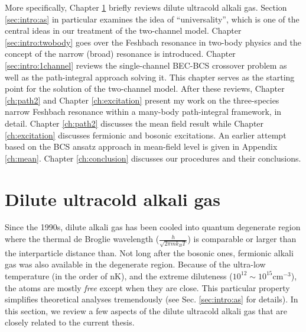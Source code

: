 More specifically, Chapter \ref{sec:intro:one} briefly reviews  dilute ultracold alkali gas.   Section \ref{sec:intro:as} in particular examines the idea of ``universality'', which is one of the central ideas in our treatment of the two-channel model.  Chapter \ref{sec:intro:twobody} goes over the Feshbach resonance in two-body physics and  the concept of  the narrow (broad) resonance is introduced. Chapter \ref{sec:intro:1channel} reviews the single-channel BEC-BCS crossover problem as well as the path-integral approach solving it. This chapter serves as the starting point for the solution of the two-channel model. After these reviews,   Chapter \ref{ch:path2} and Chapter \ref{ch:excitation} present my work on the three-species narrow Feshbach resonance within a many-body path-integral framework, in detail.   Chapter \ref{ch:path2} discusses the mean field result while Chapter \ref{ch:excitation} discusses fermionic and bosonic excitations. An earlier attempt   based on the BCS ansatz  approach in mean-field level is given in Appendix \ref{ch:mean}.  Chapter \ref{ch:conclusion} discusses our procedures and their conclusions.  

\chapter{Dilute ultracold alkali gas}\label{sec:intro:one}
  Since the 1990s, dilute  alkali gas has been cooled into quantum degenerate region where the thermal de Broglie wavelength ($\frac{h}{\sqrt{2\pi{m}k_{B}{T}}}$) is comparable or larger than the interparticle distance than.  Not long after the bosonic ones, fermionic alkali gas was also available in the degenerate region.  Because of the ultra-low temperature (in the order of nK), and the extreme diluteness ($10^{12}\sim10^{15}\text{cm}^{-3}$), the atoms are mostly \emph{free} except when they are  close.   This particular property simplifies theoretical analyses tremendously (see Sec. \ref{sec:intro:as} for details).  In this section, we review a few aspects of the dilute ultracold alkali gas that are closely related to the current thesis.     

